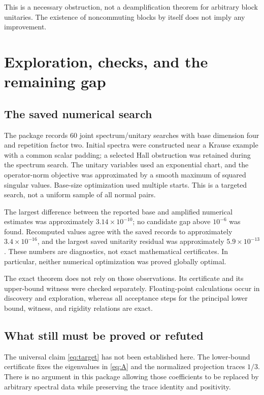 \documentclass[11pt]{article}
\theoremstyle{definition}\newtheorem{definition}[theorem]{Definition}
\theoremstyle{remark}\newtheorem{remark}[theorem]{Remark}
\begin{document}
This is a necessary obstruction, not a deamplification theorem for arbitrary block unitaries. The existence of noncommuting blocks by itself does not imply any improvement.

\section{Exploration, checks, and the remaining gap}
\subsection{The saved numerical search}
The package records $60$ joint spectrum/unitary searches with base dimension four and repetition factor two. Initial spectra were constructed near a Krause example with a common scalar padding; a selected Hall obstruction was retained during the spectrum search. The unitary variables used an exponential chart, and the operator-norm objective was approximated by a smooth maximum of squared singular values. Base-size optimization used multiple starts. This is a targeted search, not a uniform sample of all normal pairs.

The largest difference between the reported base and amplified numerical estimates was approximately $3.14\times10^{-10}$; no candidate gap above $10^{-6}$ was found. Recomputed values agree with the saved records to approximately $3.4\times10^{-16}$, and the largest saved unitarity residual was approximately $5.9\times10^{-13}$. These numbers are diagnostics, not exact mathematical certificates. In particular, neither numerical optimization was proved globally optimal.

The exact theorem does not rely on those observations. Its certificate and its upper-bound witness were checked separately. Floating-point calculations occur in discovery and exploration, whereas all acceptance steps for the principal lower bound, witness, and rigidity relations are exact.

\subsection{What still must be proved or refuted}
The universal claim \eqref{eq:target} has not been established here. The lower-bound certificate fixes the eigenvalues in \eqref{eq:A} and the normalized projection traces $1/3$. There is no argument in this package allowing those coefficients to be replaced by arbitrary spectral data while preserving the trace identity and positivity.
\end{document}
